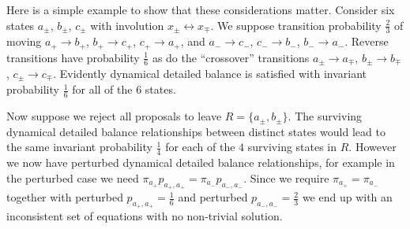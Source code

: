 \documentclass[]{article}
\begin{document}
\begin{NoteThis2}
Here is a simple example to show 
that these considerations matter.
Consider six states \(a_\pm\), \(b_\pm\), \(c_\pm\)
with involution \(x_\pm\leftrightarrow x_\mp\).
We suppose transition probability \(\tfrac{2}{3}\) of moving
\(a_+\to b_+\),
\(b_+\to c_+\),
\(c_+\to a_+\),
and
\(a_-\to c_-\),
\(c_-\to b_-\),
\(b_-\to a_-\).
Reverse transitions have probability \(\tfrac{1}{6}\)
as do the ``crossover'' transitions
\(a_\pm\to a_\mp\),
\(b_\pm\to b_\mp\),
\(c_\pm\to c_\mp\).
Evidently dynamical detailed balance
is satisfied with invariant probability \(\tfrac{1}{6}\)
for all of the \(6\) states.

Now suppose we reject all proposals to leave 
\(R=\{a_\pm, b_\pm\}\).
The surviving dynamical detailed balance
relationships between distinct states
would lead to the same
invariant probability \(\tfrac{1}{4}\) for each of the \(4\) surviving states in \(R\).
However we now have perturbed dynamical
detailed balance relationships,
for example
in the perturbed case we need
\(\pi_{a_+} p_{a_+,a_+}=\pi_{a_-} p_{a_-,a_-}\).
Since we require
\(\pi_{a_+}=\pi_{a_-}\)
together with perturbed \(p_{a_+,a_+}=\tfrac{1}{6}\)
and perturbed \(p_{a_-,a_-}=\tfrac{2}{3}\)
we end up with an inconsistent set of equations
with no non-trivial solution.
\end{NoteThis2}
\end{document}
